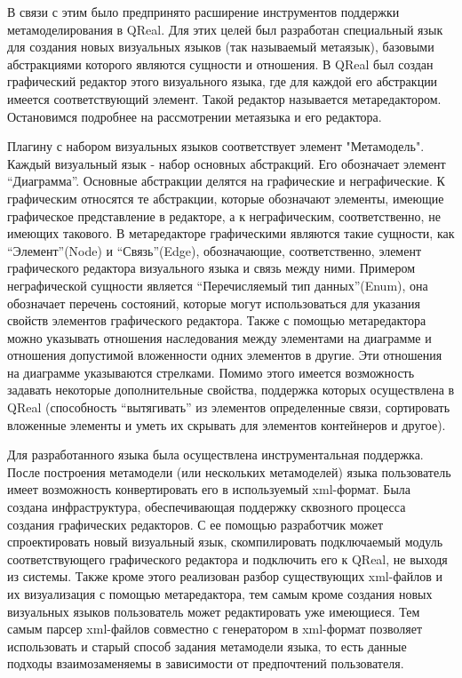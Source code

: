 \documentclass[a4paper]{article}
\begin{document}
В связи с этим было предпринято расширение инструментов поддержки метамоделирования в QReal. Для этих целей был разработан специальный язык для создания новых визуальных языков (так называемый метаязык), базовыми абстракциями которого являются сущности и отношения. В QReal был создан графический редактор этого визуального языка, где для каждой его абстракции имеется соответствующий элемент. Такой редактор называется метаредактором. Остановимся подробнее на рассмотрении метаязыка и его редактора. 

Плагину с набором визуальных языков соответствует элемент "Метамодель". Каждый визуальный язык - набор основных абстракций. Его обозначает элемент "`Диаграмма"'. Основные абстракции делятся на графические и неграфические. К графическим относятся те абстракции, которые обозначают элементы, имеющие графическое представление в редакторе, а к неграфическим, соответственно, не имеющих такового. В метаредакторе графическими являются такие сущности, как "`Элемент"'(Node) и "`Связь"'(Edge), обозначающие, соответственно, элемент графического редактора визуального языка и связь между ними. Примером неграфической сущности является "`Перечисляемый тип данных"'(Enum), она обозначает перечень состояний, которые могут использоваться для указания свойств элементов графического редактора. Также с помощью метаредактора можно указывать отношения наследования между элементами на диаграмме и отношения допустимой вложенности одних элементов в другие. Эти отношения на диаграмме указываются стрелками. Помимо этого имеется возможность задавать некоторые дополнительные свойства, поддержка которых осуществлена в QReal (способность “вытягивать” из элементов определенные связи, сортировать вложенные элементы и уметь их скрывать для элементов контейнеров и другое). 

Для разработанного языка была осуществлена инструментальная поддержка. После построения метамодели (или нескольких метамоделей) языка пользователь имеет возможность конвертировать его в используемый xml-формат. Была создана инфраструктура, обеспечивающая поддержку сквозного процесса создания графических редакторов. С ее помощью разработчик может спроектировать новый визуальный язык, скомпилировать подключаемый модуль соответствующего графического редактора и подключить его к QReal, не выходя из системы. Также кроме этого реализован разбор существующих xml-файлов и их визуализация с помощью метаредактора, тем самым кроме создания новых визуальных языков пользователь может редактировать уже имеющиеся. Тем самым парсер xml-файлов совместно с генератором в xml-формат позволяет использовать и старый способ задания метамодели языка, то есть данные подходы взаимозаменяемы в зависимости от предпочтений пользователя.
\end{document}

